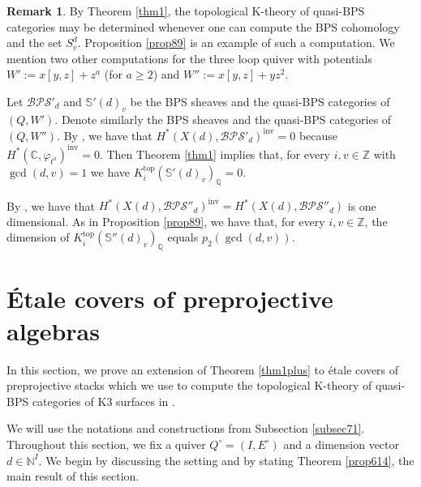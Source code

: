 \documentclass [11pt,oneside,a4paper,mathscr]{amsart}
\theoremstyle{definition}
\newtheorem{remark}[thm]{Remark}
\renewcommand{\geq}{\geqslant}
\begin{document}
\begin{remark}
    By Theorem \ref{thm1}, the topological K-theory of quasi-BPS categories may be determined whenever one can compute the BPS cohomology and the set $S^d_v$. Proposition \ref{prop89} is an example of such a computation. 
    We mention two other computations for the three loop quiver with potentials $W':=x[y,z]+z^a$ (for $a\geq 2$) and $W'':=x[y,z]+yz^2$. 
    
    Let $\mathcal{BPS}'_d$ and $\mathbb{S}'(d)_v$ be the BPS sheaves and the quasi-BPS categories of $(Q,W')$. Denote similarly the BPS sheaves and the quasi-BPS categories of $(Q,W'')$.
    By \cite[Theorem 1.5]{DP}, we have that $H^{\ast}(X(d), \mathcal{BPS}'_d)^{\mathrm{inv}}=0$ because $H^{\ast}(\mathbb{C}, \varphi_{t^a})^{\mathrm{inv}}=0$. Then Theorem \ref{thm1} implies that, for every $i, v\in \mathbb{Z}$ with $\gcd(d,v)=1$
    we have $K^{\mathrm{top}}_i(\mathbb{S}'(d)_v)_{\mathbb{Q}}=0$. 
  
    By \cite[Corollary 7.2]{DP}, we have that $H^{\ast}(X(d), \mathcal{BPS}''_d)^{\mathrm{inv}}=H^{\ast}(X(d), \mathcal{BPS}''_d)$ is one dimensional. As in Proposition \ref{prop89}, we have that, for every $i,v\in\mathbb{Z}$, 
    the dimension of $K^{\mathrm{top}}_i(\mathbb{S}''(d)_v)_{\mathbb{Q}}$
    equals $p_2(\gcd(d,v))$.  
\end{remark}





\section{\'Etale covers of preprojective algebras}\label{subsec67}

 
In this section, we prove an extension of Theorem \ref{thm1plus} to étale covers of preprojective stacks which we use to compute the topological K-theory of quasi-BPS categories of K3 surfaces in \cite{PTK3}.

We will use the notations and constructions from Subsection \ref{subsec71}.
Throughout this section, we fix a quiver $Q^\circ=(I, E^{\circ})$ and a dimension vector $d\in\mathbb{N}^I$.
We begin by discussing the setting and by stating Theorem \ref{prop614}, the main result of this section.
\end{document}
